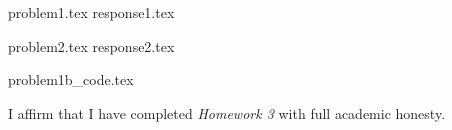 \documentclass[letterpaper, 12pt]{article}
\begin{document}

% 
{problem1.tex}
{response1.tex}

% 
{problem2.tex}
{response2.tex}


\appendix

{problem1b_code.tex}

\par

I affirm that I have completed \textit{Homework 3} with full academic honesty.
\end{document}
